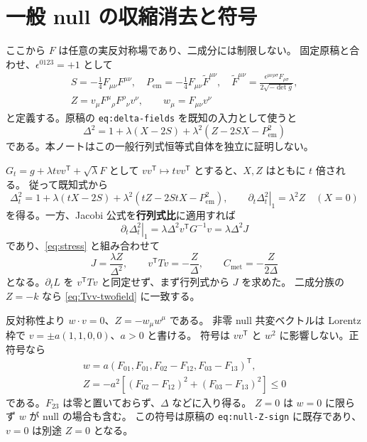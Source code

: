 \documentclass[11pt,a4paper]{article}
\newcommand{\Cmet}{C_{\mathrm{met}}}
\newcommand{\Pem}{P_{\mathrm{em}}}
\begin{document}
\newpage
\section{一般 null の収縮消去と符号}
ここから $F$ は任意の実反対称場であり、二成分には制限しない。
固定原稿と合わせ、$\epsilon^{0123}=+1$ として
\begin{equation}\label{eq:field-invariants}
\begin{gathered}
S=-\tfrac14F_{\mu\nu}F^{\mu\nu},\quad
\Pem=-\tfrac14F_{\mu\nu}\widetilde F^{\mu\nu},\quad
\widetilde F^{\mu\nu}=\frac{\epsilon^{\mu\nu\rho\sigma}F_{\rho\sigma}}{2\sqrt{-\det g}},\\
Z=v_\mu F^\mu{}_{\rho}F^\rho{}_{\nu}v^\nu,\qquad
w_\mu=F_{\mu\nu}v^\nu
\end{gathered}
\end{equation}
と定義する。原稿の \texttt{eq:delta-fields} を既知の入力として使うと
\begin{equation}\label{eq:known-det}
\Delta^2=1+\lambda(X-2S)+\lambda^2(Z-2SX-\Pem^2)
\end{equation}
である。本ノートはこの一般行列式恒等式自体を独立に証明しない。

$G_t=g+\lambda t vv^{\mathsf T}+\sqrt\lambda F$ として
$vv^{\mathsf T}\mapsto t vv^{\mathsf T}$ とすると、$X,Z$ はともに $t$ 倍される。
従って既知式から
\begin{equation}\label{eq:amplitude}
\Delta_t^2=1+\lambda(tX-2S)+\lambda^2(tZ-2StX-\Pem^2),\qquad
\left.\partial_t\Delta_t^2\right|_1=\lambda^2Z\quad(X=0)
\end{equation}
を得る。一方、Jacobi 公式を\textbf{行列式比}に適用すれば
\begin{equation}\label{eq:amplitude-jacobi}
\left.\partial_t\Delta_t^2\right|_1
=\lambda\Delta^2v^{\mathsf T}G^{-1}v=\lambda\Delta^2J
\end{equation}
であり、\eqref{eq:stress} と組み合わせて
\begin{equation}\label{eq:general-contraction}
\boxed{J=\frac{\lambda Z}{\Delta^2},\qquad
v^{\mathsf T}Tv=-\frac Z\Delta,\qquad \Cmet=-\frac Z{2\Delta}}
\end{equation}
となる。$\partial_tL$ を $v^{\mathsf T}Tv$ と同定せず、まず行列式から $J$ を求めた。
二成分族の $Z=-k$ なら \eqref{eq:Tvv-twofield} に一致する。

反対称性より $w\cdot v=0$、$Z=-w_\mu w^\mu$ である。
非零 null 共変ベクトルは Lorentz 枠で $v=\pm a(1,1,0,0)$、$a>0$ と書ける。
符号は $vv^{\mathsf T}$ と $w^2$ に影響しない。正符号なら
\begin{equation}\label{eq:general-sign}
\begin{gathered}
w=a(F_{01},F_{01},F_{02}-F_{12},F_{03}-F_{13})^{\mathsf T},\\
Z=-a^2\left[(F_{02}-F_{12})^2+(F_{03}-F_{13})^2\right]\leq0
\end{gathered}
\end{equation}
である。$F_{23}$ は零と置いておらず、$\Delta$ などに入り得る。
$Z=0$ は $w=0$ に限らず $w$ が null の場合も含む。
この符号は原稿の \texttt{eq:null-Z-sign} に既存であり、$v=0$ は別途 $Z=0$ となる。
\end{document}
